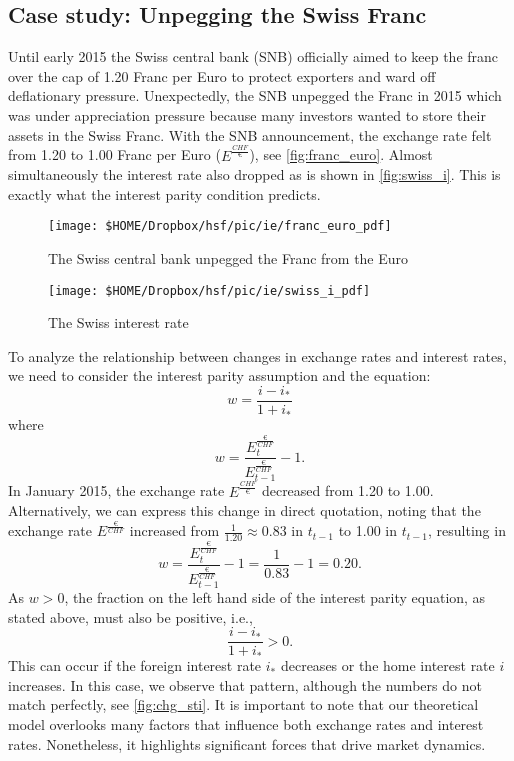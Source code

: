 \pbn
\subsection*{Case study: Unpegging the Swiss Franc}

Until early 2015 the Swiss central bank (SNB) officially aimed to keep the franc over the cap of 1.20 Franc per Euro to protect exporters and ward off deflationary pressure. Unexpectedly, the SNB unpegged the Franc in 2015 which was under appreciation pressure because many investors wanted to store their assets in the Swiss Franc. With the SNB announcement, the exchange rate felt from 1.20 to 1.00 Franc per Euro ($E^{\frac{CHF}{\euro}}$), see \autoref{fig:franc_euro}. Almost simultaneously the interest rate also dropped as is shown in \autoref{fig:swiss_i}. This is exactly what the interest parity condition predicts.
	
	
\begin{minipage}{0.5\linewidth}
	\begin{figure}[H]
		\centering
		\texttt{[image: \$HOME/Dropbox/hsf/pic/ie/franc\_euro\_pdf]}

		\caption{The Swiss central bank unpegged the Franc from the Euro}
	\label{fig:franc_euro}
	\end{figure}
\end{minipage}	
\begin{minipage}{0.5\linewidth}
	\begin{figure}[H]
		\centering
		\texttt{[image: \$HOME/Dropbox/hsf/pic/ie/swiss\_i\_pdf]}
		
		\caption{The Swiss interest rate}
		\label{fig:swiss_i}
	\end{figure}
\end{minipage}	

To analyze the relationship between changes in exchange rates and interest rates, we need to consider the interest parity assumption and the equation:
$$
w= \frac{i-i_{*}}{1+i_{*}}
$$
where
$$w=\frac{E_{t}^{\frac{\euro}{CHF}}}{E_{t-1}^{\frac{\euro}{CHF}}}-1.$$
In January 2015, the exchange rate $E^{\frac{CHF}{\euro}}$ decreased from 1.20 to 1.00. Alternatively, we can express this change in direct quotation, noting that the exchange rate $E^{\frac{\euro}{CHF}}$ increased from $\frac{1}{1.20}\approx 0.83$ in $t_{t-1}$ to 1.00 in $t_{t-1}$, resulting in
$$
w=\frac{E_{t}^{\frac{\euro}{CHF}}}{E_{t-1}^{\frac{\euro}{CHF}}}-1=\frac{1}{0.83}-1=0.20.
$$
As $w>0$, the fraction on the left hand side of the interest parity equation, as stated above, must also be positive, i.e., $$\frac{i-i_{*}}{1+i_{*}}>0.$$ This can occur if the foreign interest rate $i_*$ decreases or the home interest rate $i$ increases. In this case, we observe that pattern, although the numbers do not match perfectly, see \autoref{fig:chg_sti}. It is important to note that our theoretical model overlooks many factors that influence both exchange rates and interest rates. Nonetheless, it highlights significant forces that drive market dynamics.

